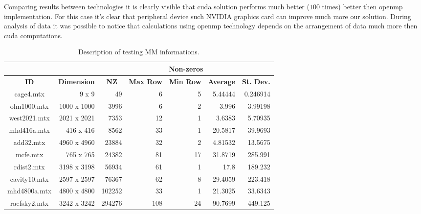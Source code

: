 	Comparing results between technologies it is clearly visible that \gls{cuda} solution performs much better ($100$ times) better then \gls{openmp} implementation. For this case it's clear that peripheral device such NVIDIA graphics card can improve much more our solution. During analysis of data it was possible to notice that calculations using \gls{openmp} technology depends on the arrangement of data much more then \gls{cuda} computations.
	
	
	\begin{table}[!htp]
		\centering
		\caption{Description of testing \glsdesc{MM} informations.}
		\label{tab:matrix-info}
		\begin{adjustbox}{max width=\textwidth}
			\begin{tabular}{cr|r|r|r|r|r|}
				\cline{3-7}
				&  & \multicolumn{5}{c|}{\textbf{Non-zeros}} \\ \hline
				\multicolumn{1}{|c|}{\textbf{ID}} & \multicolumn{1}{c|}{\textbf{Dimension}} & \multicolumn{1}{c|}{\textbf{NZ}} & \multicolumn{1}{c|}{\textbf{Max Row}} & \multicolumn{1}{c|}{\textbf{Min Row}} & \multicolumn{1}{c|}{\textbf{Average}} & \multicolumn{1}{c|}{\textbf{St. Dev.}} \\ \hline \hline
				\multicolumn{1}{|c|}{cage4.mtx} & 9 x 9 & 49 & 6 & 5 & 5.44444 & 0.246914 \\ \hline
				\multicolumn{1}{|c|}{olm1000.mtx} & 1000 x 1000 & 3996 & 6 & 2 & 3.996 & 3.99198 \\ \hline
				\multicolumn{1}{|c|}{west2021.mtx} & 2021 x 2021 & 7353 & 12 & 1 & 3.6383 & 5.70935 \\ \hline
				\multicolumn{1}{|c|}{mhd416a.mtx} & 416 x 416 & 8562 & 33 & 1 & 20.5817 & 39.9693 \\ \hline
				\multicolumn{1}{|c|}{add32.mtx} & 4960 x 4960 & 23884 & 32 & 2 & 4.81532 & 13.5675 \\ \hline
				\multicolumn{1}{|c|}{mcfe.mtx} & 765 x 765 & 24382 & 81 & 17 & 31.8719 & 285.991 \\ \hline
				\multicolumn{1}{|c|}{rdist2.mtx} & 3198 x 3198 & 56934 & 61 & 1 & 17.8 & 189.232 \\ \hline
				\multicolumn{1}{|c|}{cavity10.mtx} & 2597 x 2597 & 76367 & 62 & 8 & 29.4059 & 223.418 \\ \hline
				\multicolumn{1}{|c|}{mhd4800a.mtx} & 4800 x 4800 & 102252 & 33 & 1 & 21.3025 & 33.6343 \\ \hline
				\multicolumn{1}{|c|}{raefsky2.mtx} & 3242 x 3242 & 294276 & 108 & 24 & 90.7699 & 449.125 \\ \hline

\end{tabular}
\end{adjustbox}
\end{table}
